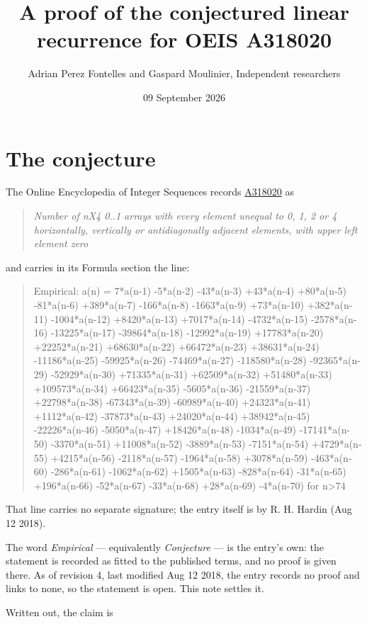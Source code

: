 \documentclass[11pt]{article}
\title{A proof of the conjectured linear recurrence for OEIS A318020}
\author{Adrian Perez Fontelles and Gaspard Moulinier, Independent researchers}
\date{09 September 2026}
\theoremstyle{definition}
\begin{document}
\maketitle
\section{The conjecture}

The Online Encyclopedia of Integer Sequences records \href{https://oeis.org/A318020}{A318020} as

\begin{quote}\itshape Number of nX4 0..1 arrays with every element unequal to 0, 1, 2 or 4 horizontally, vertically or antidiagonally adjacent elements, with upper left element zero\end{quote}

and carries in its Formula section the line:

\begin{quote}\ttfamily Empirical: a(n) = 7*a(n-1) -5*a(n-2) -43*a(n-3) +43*a(n-4) +80*a(n-5) -81*a(n-6) +389*a(n-7) -166*a(n-8) -1663*a(n-9) +73*a(n-10) +382*a(n-11) -1004*a(n-12) +8420*a(n-13) +7017*a(n-14) -4732*a(n-15) -2578*a(n-16) -13225*a(n-17) -39864*a(n-18) -12992*a(n-19) +17783*a(n-20) +22252*a(n-21) +68630*a(n-22) +66472*a(n-23) +38631*a(n-24) -11186*a(n-25) -59925*a(n-26) -74469*a(n-27) -118580*a(n-28) -92365*a(n-29) -52929*a(n-30) +71335*a(n-31) +62509*a(n-32) +51480*a(n-33) +109573*a(n-34) +66423*a(n-35) -5605*a(n-36) -21559*a(n-37) +22798*a(n-38) -67343*a(n-39) -60989*a(n-40) +24323*a(n-41) +1112*a(n-42) -37873*a(n-43) +24020*a(n-44) +38942*a(n-45) -22226*a(n-46) -5050*a(n-47) +18426*a(n-48) -1034*a(n-49) -17141*a(n-50) -3370*a(n-51) +11008*a(n-52) -3889*a(n-53) -7151*a(n-54) +4729*a(n-55) +4215*a(n-56) -2118*a(n-57) -1964*a(n-58) +3078*a(n-59) -463*a(n-60) -286*a(n-61) -1062*a(n-62) +1505*a(n-63) -828*a(n-64) -31*a(n-65) +196*a(n-66) -52*a(n-67) -33*a(n-68) +28*a(n-69) -4*a(n-70) for n>74\end{quote}

That line carries no separate signature; the entry itself is by R. H. Hardin (Aug 12 2018).

The word {\itshape Empirical} --- equivalently {\itshape Conjecture} --- is the entry's own: the statement is recorded as fitted to the published terms, and no proof is given there. As of revision 4, last modified Aug 12 2018, the entry records no proof and links to none, so the statement is open. This note settles it.

Written out, the claim is
\end{document}
